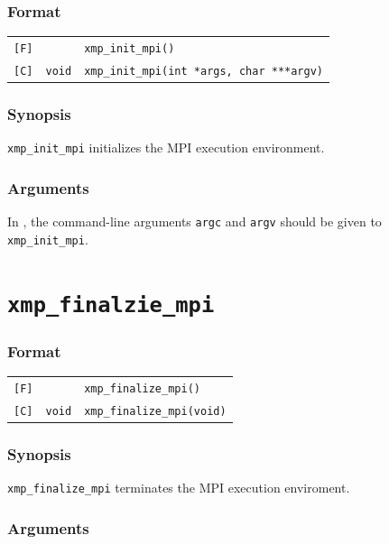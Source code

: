 \subsubsection*{Format}

\begin{tabular}{lll}
\verb![F]!&  {\tt }& {\tt xmp\_init\_mpi()}\\

\verb![C]!&  {\tt void}& {\tt xmp\_init\_mpi(int *args, char ***argv)}
\end{tabular}

\subsubsection*{Synopsis}

   {\tt xmp\_init\_mpi} initializes the MPI execution environment.

\subsubsection*{Arguments}

   In {\XMPC}, the command-line arguments {\tt argc} and {\tt argv}
   should be given to {\tt xmp\_init\_mpi}.


\section{\tt xmp\_finalzie\_mpi}

\subsubsection*{Format}

\begin{tabular}{lll}
\verb![F]!&  {\tt }& {\tt xmp\_finalize\_mpi()}\\

\verb![C]!&  {\tt void}& {\tt xmp\_finalize\_mpi(void)}
\end{tabular}

\subsubsection*{Synopsis}

   {\tt xmp\_finalize\_mpi} terminates the MPI execution enviroment.

\subsubsection*{Arguments}

